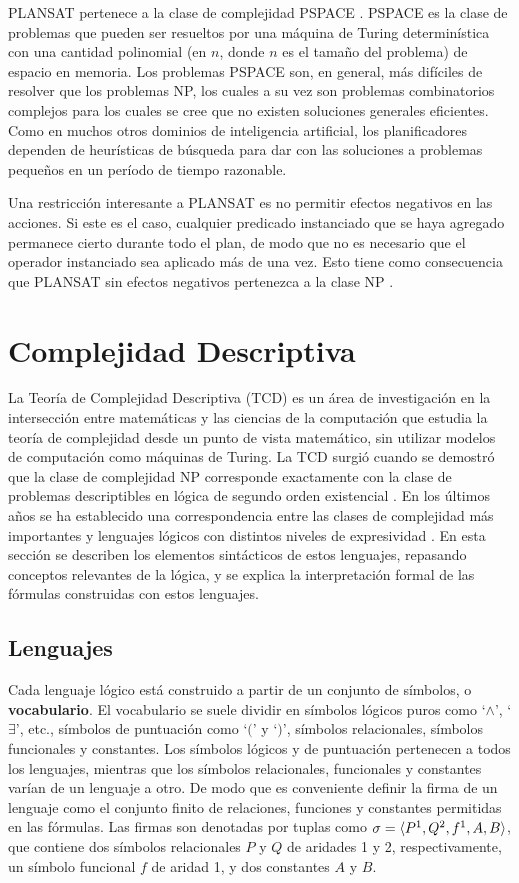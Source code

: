 PLANSAT pertenece a la clase de complejidad PSPACE \citep{ghallab:book}.
PSPACE es la clase de problemas que pueden ser resueltos por una máquina de
Turing determinística con una cantidad polinomial (en $n$, donde $n$ es el
tamaño del problema) de espacio en memoria. Los problemas PSPACE son, en
general, más difíciles de resolver que los problemas NP, los cuales a su vez
son problemas combinatorios complejos para los cuales se cree que no existen
soluciones generales eficientes. Como en muchos otros dominios de inteligencia
artificial, los planificadores dependen de
heurísticas de búsqueda para dar con las soluciones a problemas pequeños en un 
período de tiempo razonable.

Una restricción interesante a PLANSAT es no permitir efectos negativos en las
acciones. Si este es el caso, cualquier predicado instanciado que se haya 
agregado permanece cierto durante todo el plan, de modo que no es necesario
que el operador instanciado sea aplicado más de una vez.
Esto tiene como consecuencia que PLANSAT sin efectos 
negativos pertenezca a la clase NP \citep{ghallab:book}.

\section{Complejidad Descriptiva}
La Teoría de Complejidad Descriptiva (TCD) es un área de investigación en la
intersección entre matemáticas y las ciencias de la computación 
que estudia la teoría de complejidad desde un punto de vista matemático, 
sin utilizar modelos de computación como máquinas de Turing. La TCD surgió
cuando se demostró que la clase de complejidad NP corresponde
exactamente con la clase de problemas descriptibles en lógica de segundo orden
existencial \citep{fagin:spectra}. En los últimos años se ha establecido una
correspondencia entre las clases de complejidad más importantes y lenguajes
lógicos con distintos niveles de expresividad \citep{immerman:book}. En esta
sección se describen los elementos sintácticos de estos lenguajes, repasando
conceptos relevantes de la lógica, y se explica la interpretación formal de
las fórmulas construidas con estos lenguajes.

\subsection{Lenguajes}
Cada lenguaje lógico está construido a partir de un conjunto de símbolos, o
\textbf{vocabulario}.
El vocabulario se suele dividir en símbolos lógicos puros como `$\land$',
`$\exists$', etc., símbolos de puntuación como `$($' y `$)$', símbolos
relacionales, símbolos funcionales y constantes. Los símbolos lógicos y de
puntuación pertenecen a todos los lenguajes, mientras que los símbolos
relacionales, funcionales y constantes varían de un lenguaje a otro. De modo
que es conveniente definir la firma de un lenguaje como el conjunto finito de
relaciones, funciones y constantes permitidas en las fórmulas. Las firmas son
denotadas por tuplas como $\sigma=\langle P^1,Q^2,f^1,A,B \rangle$, que contiene dos
símbolos relacionales $P$ y $Q$ de aridades 1 y 2, respectivamente, un símbolo
funcional $f$ de aridad 1, y dos constantes $A$ y $B$.

